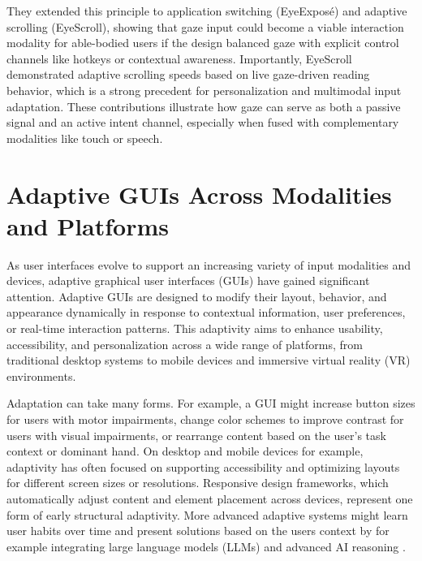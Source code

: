 \documentclass[openany]{book}
\begin{document}
They extended this principle to application switching (EyeExposé) and adaptive scrolling (EyeScroll), showing that gaze input could become a viable interaction modality for able-bodied users if the design balanced gaze with explicit control channels like hotkeys or contextual awareness. Importantly, EyeScroll demonstrated adaptive scrolling speeds based on live gaze-driven reading behavior, which is a strong precedent for personalization and multimodal input adaptation. These contributions illustrate how gaze can serve as both a passive signal and an active intent channel, especially when fused with complementary modalities like touch or speech.

\section{Adaptive GUIs Across Modalities and Platforms}
As user interfaces evolve to support an increasing variety of input modalities and devices, adaptive graphical user interfaces (GUIs) have gained significant attention. Adaptive GUIs are designed to modify their layout, behavior, and appearance dynamically in response to contextual information, user preferences, or real-time interaction patterns. This adaptivity aims to enhance usability, accessibility, and personalization across a wide range of platforms, from traditional desktop systems to mobile devices and immersive virtual reality (VR) environments.

Adaptation can take many forms. For example, a GUI might increase button sizes for users with motor impairments, change color schemes to improve contrast for users with visual impairments, or rearrange content based on the user's task context or dominant hand. On desktop and mobile devices for example, adaptivity has often focused on supporting accessibility and optimizing layouts for different screen sizes or resolutions. Responsive design frameworks, which automatically adjust content and element placement across devices, represent one form of early structural adaptivity. More advanced adaptive systems might learn user habits over time and present solutions based on the users context by for example integrating large language models (LLMs) and advanced AI reasoning \cite{Gajos2008SUPPLE}.
\end{document}
